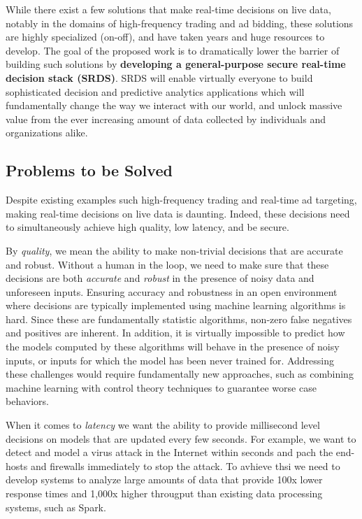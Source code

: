 \documentclass [10pt]{article}
\begin{document}
\begin{outline}
While there exist a few solutions that make real-time decisions on live data, notably in the domains of high-frequency trading and ad bidding, these solutions are highly specialized (on-off), and have taken years and huge resources to develop. The goal of the proposed work is to dramatically lower the barrier of building such solutions by {\bf developing a general-purpose secure real-time decision stack (SRDS)}. SRDS will enable virtually everyone to build sophisticated decision and predictive analytics applications which will fundamentally change the way we interact with our world, and unlock massive value from the ever increasing amount of data collected by individuals and organizations alike.

\subsection{Problems to be Solved}

Despite existing examples such high-frequency trading and real-time ad targeting, making real-time decisions on live data is daunting. Indeed, these decisions need to simultaneously achieve high quality, low latency, and be secure. 

By {\em quality}, we mean the ability to make non-trivial decisions that are accurate and robust. Without a human in the loop, we need to make sure that these decisions are both {\em accurate} and {\em robust} in the presence of noisy data and unforeseen inputs. Ensuring accuracy and robustness in an open environment where decisions are typically implemented using machine learning algorithms is hard. Since these are fundamentally statistic algorithms, non-zero false negatives and positives are inherent. In addition,  it is virtually impossible to predict how the models computed by these  algorithms will behave in the presence of noisy inputs, or inputs for which the model has been never trained for. Addressing these challenges would require fundamentally new approaches, such as combining machine learning with control theory techniques to guarantee worse case behaviors.

When it comes to {\em latency} we want the ability to provide millisecond level decisions on models that are updated every few seconds. For example, we want to detect and model a virus attack in the Internet within seconds and pach the end-hosts and firewalls immediately to stop the attack. To avhieve thsi we need to develop systems to analyze large amounts of data that provide 100x lower response times and 1,000x higher througput than existing data processing systems, such as Spark. 


\end{outline}
\end{document}
